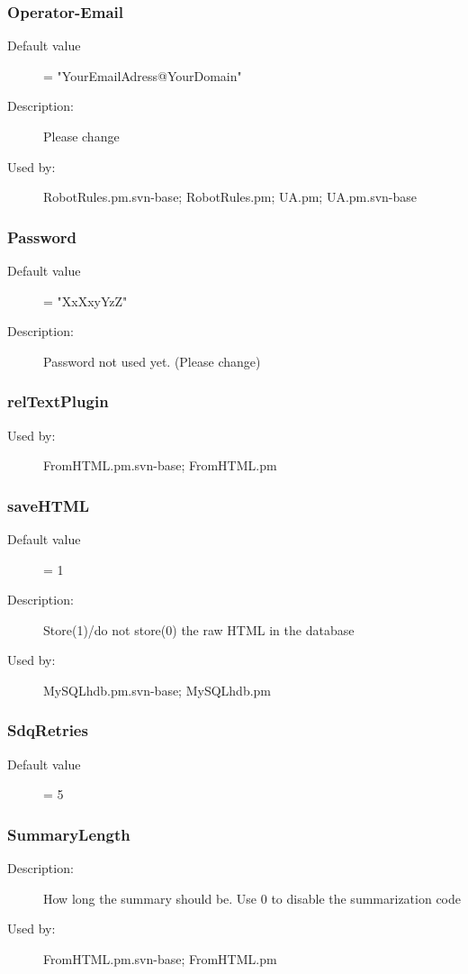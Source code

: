 \subsubsection{Operator-Email}
\label{Operator-Email}
\begin{description}
\item[Default value] = "YourEmailAdress@YourDomain"
\item[Description:] Please change
\item[Used by:] RobotRules.pm.svn-base; RobotRules.pm; UA.pm; UA.pm.svn-base
\end{description}
\subsubsection{Password}
\label{Password}
\begin{description}
\item[Default value] = "XxXxyYzZ"
\item[Description:] Password not used yet. (Please change)
\end{description}
\subsubsection{relTextPlugin}
\label{relTextPlugin}
\begin{description}
\item[Used by:] FromHTML.pm.svn-base; FromHTML.pm
\end{description}
\subsubsection{saveHTML}
\label{saveHTML}
\begin{description}
\item[Default value] = 1
\item[Description:] Store(1)/do not store(0) the raw HTML in the database
\item[Used by:] MySQLhdb.pm.svn-base; MySQLhdb.pm
\end{description}
\subsubsection{SdqRetries}
\label{SdqRetries}
\begin{description}
\item[Default value] = 5
\end{description}
\subsubsection{SummaryLength}
\label{SummaryLength}
\begin{description}
\item[Description:] How long the summary should be. Use 0 to disable the summarization code
\item[Used by:] FromHTML.pm.svn-base; FromHTML.pm
\end{description}
